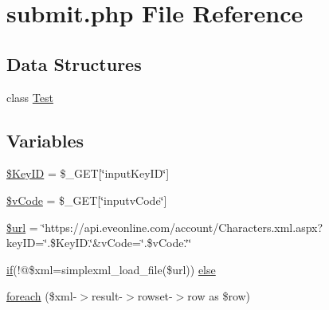 \hypertarget{submit_8php}{\section{submit.\+php File Reference}
\label{submit_8php}
}
\subsection*{Data Structures}
\begin{DoxyCompactItemize}
\item 
class \hyperlink{class_test}{Test}
\end{DoxyCompactItemize}
\subsection*{Variables}
\begin{DoxyCompactItemize}
\item 
\hyperlink{submit_8php_a1585f1347cd30da8040cc965a42421e3}{\$\+Key\+I\+D} = \$\+\_\+\+G\+E\+T\mbox{[}\char`\"{}input\+Key\+I\+D\char`\"{}\mbox{]}
\item 
\hyperlink{submit_8php_a55dd43886b9084aeee05444024079444}{\$v\+Code} = \$\+\_\+\+G\+E\+T\mbox{[}\char`\"{}inputv\+Code\char`\"{}\mbox{]}
\item 
\hyperlink{submit_8php_acf215f34a917d014776ce684a9ee8909}{\$url} = \char`\"{}https\+://api.\+eveonline.\+com/account/Characters.\+xml.\+aspx?key\+I\+D=\char`\"{}.\$Key\+I\+D.\char`\"{}\&v\+Code=\char`\"{}.\$v\+Code.\char`\"{}\char`\"{}
\item 
\hyperlink{jquery_8js_ab4c5802d7f227159da47eb29ec6900c0}{if}(!@\$xml=simplexml\+\_\+load\+\_\+file(\$url)) \hyperlink{submit_8php_ac88ce4490803385e170e756011ae87f5}{else}
\item 
\hyperlink{submit_8php_ac504d4a137641e880f0b9693d36d2e16}{foreach} (\$xml-\/$>$result-\/$>$rowset-\/$>$row as \$row)
\end{DoxyCompactItemize}



